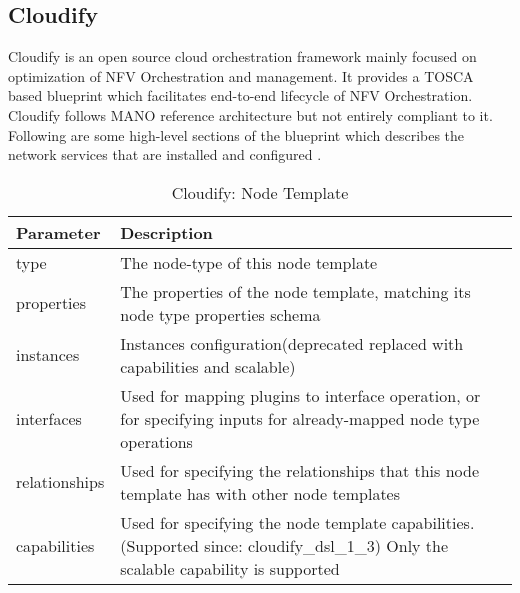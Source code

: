\subsection{Cloudify}
Cloudify is an open source cloud orchestration framework mainly focused on optimization of NFV Orchestration and management. It provides a TOSCA based blueprint which facilitates end-to-end lifecycle of NFV Orchestration. Cloudify follows MANO reference architecture but not entirely compliant to it\cite{de2018network}. Following are some high-level sections of the blueprint which describes the network services that are installed and configured \cite{CloudifySchemaDocumentation}.
    \begin{table}[h]
        \centering
    \begin{tabular}{ |p{4cm}|p{10cm}|}
        \hline
        \textbf{Parameter} & \textbf{Description} \\
        \hline
         
         type & The node-type of this node template \\
         \hline
         properties &   The properties of the node template, matching its node type properties schema \\
         \hline
         instances &    Instances configuration(deprecated replaced with capabilities and scalable) \\
         \hline
         interfaces  & Used for mapping plugins to interface operation, or for specifying inputs for already-mapped node type operations \\
         \hline
         relationships &    Used for specifying the relationships that this node template has with other node templates \\
         \hline
         capabilities & Used for specifying the node template capabilities. (Supported since: cloudify\_dsl\_1\_3) Only the scalable capability is supported\\
         \hline
    \end{tabular}
    \caption{Cloudify: Node Template}
    \label{tab:Cloudify_node_template}
 \end{table}
